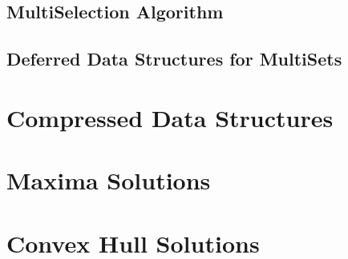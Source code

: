 \subsection{MultiSelection Algorithm}
\label{sec:multiselect}

\subsection{Deferred Data Structures for MultiSets}
\label{sec:dds}

\section{Compressed Data Structures}
\label{sec:compressed}

\section{Maxima Solutions}

\section{Convex Hull Solutions}

